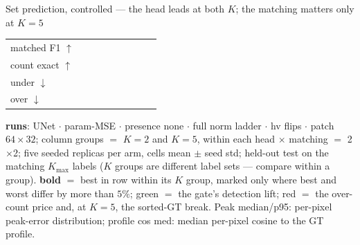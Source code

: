\begin{frame}{Set prediction, controlled --- the head leads at both $K$; the matching matters only at $K{=}5$}
\begin{tabular}{@{}l cc !{\hspace{2pt}} cc !{\hspace{8pt}} cc !{\hspace{2pt}} cc@{}}
    matched F1 $\uparrow$ &  &  &  &  &  &  &  &  \\
    count exact $\uparrow$ &  &  &  &  &  &  &  &  \\
    \quad under $\downarrow$ &  &  &  &  &  &  &  &  \\
    \quad over $\downarrow$ &  &  &  &  &  &  &  &  \\
    \bottomrule
  \end{tabular}
  \par\vspace{3pt}
  \parbox{0.94\textwidth}{\tiny\color{soft} \textbf{runs}: UNet $\cdot$ param-MSE $\cdot$ presence none $\cdot$ full norm ladder $\cdot$ hv flips $\cdot$ patch $64{\times}32$; column groups $=$ $K{=}2$ and $K{=}5$, within each head $\times$ matching $=$ 2$\times$2; five seeded replicas per arm, cells mean $\pm$ seed std; held-out test on the matching $K_{\max}$ labels ($K$ groups are different label sets --- compare within a group). \textbf{bold} $=$ best in row within its $K$ group, marked only where best and worst differ by more than $5\%$; \textcolor{good}{green} $=$ the gate's detection lift; \textcolor{accent}{red} $=$ the over-count price and, at $K{=}5$, the sorted-GT break. Peak median/p95: per-pixel peak-error distribution; profile cos med: median per-pixel cosine to the GT profile.\par}
\end{frame}

